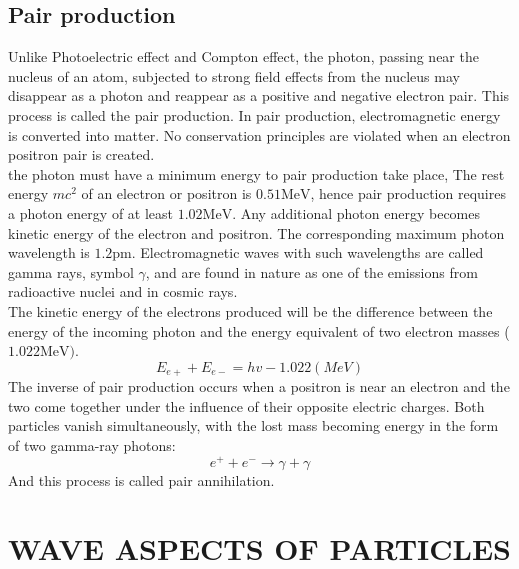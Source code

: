 \subsection{Pair production}
Unlike Photoelectric effect and Compton effect,  the photon, passing near the nucleus of an atom,  subjected to strong field effects from the nucleus  may disappear as a photon and reappear as a positive and negative electron pair. This process is called the pair production. In  pair production,  electromagnetic energy is converted into matter.  No conservation principles are violated when an electron positron pair is created.\\
the photon must have a minimum energy to pair production take place,
The rest energy $m c^{2}$ of an electron or positron is $0.51 \mathrm{MeV}$, hence pair production requires a photon energy of at least $1.02 \mathrm{MeV}$. Any additional photon energy becomes kinetic energy of the electron and positron. The corresponding maximum photon wavelength is $1.2 \mathrm{pm}$. Electromagnetic waves with such wavelengths are called gamma rays, symbol $\gamma$, and are found in nature as one of the emissions from radioactive nuclei and in cosmic rays. \\
The kinetic energy of the electrons produced will be the difference between the energy of the incoming photon and the energy equivalent of two electron masses (  $1.022 \mathrm{MeV})$.
$$
{E}_{{e}+}+{E}_{{e}-}={h} v-{1 . 0 2 2}({M e V})
$$
The inverse of pair production occurs when a positron is near an electron and the two come together under the influence of their opposite electric charges. Both particles vanish simultaneously, with the lost mass becoming energy in the form of two gamma-ray photons:
$$
e^{+}+e^{-} \rightarrow \gamma+\gamma
$$
And this process is called pair annihilation.
\section{WAVE ASPECTS OF PARTICLES}
